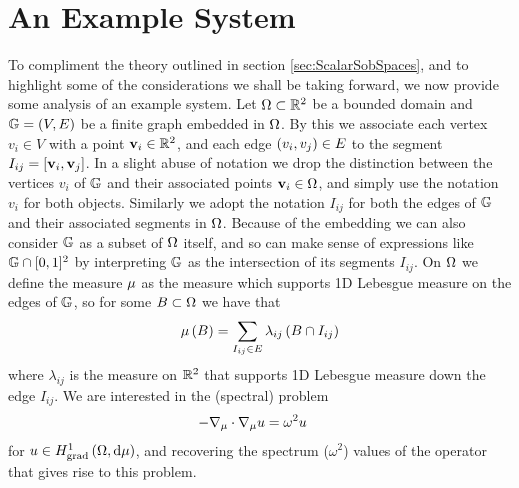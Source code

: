 \section{An Example System}
To compliment the theory outlined in section \ref{sec:ScalarSobSpaces}, and to highlight some of the considerations we shall be taking forward, we now provide some analysis of an example system.
Let $\Omega\subset\mathbb{R}^2$ be a bounded domain and $\mathbb{G} = \left( V,E \right)$ be a finite graph embedded in $\Omega$.
By this we associate each vertex $v_i\in V$ with a point $\mathbf{v}_i\in\mathbb{R}^2$, and each edge $\left( v_i,v_j \right)\in E$ to the segment $I_{ij}=\left[ \mathbf{v}_i,\mathbf{v}_j \right]$.
In a slight abuse of notation we drop the distinction between the vertices $v_i$ of $\mathbb{G}$ and their associated points $\mathbf{v}_i\in\Omega$, and simply use the notation $v_i$ for both objects.
Similarly we adopt the notation $I_{ij}$ for both the edges of $\mathbb{G}$ and their associated segments in $\Omega$.
Because of the embedding we can also consider $\mathbb{G}$ as a subset of $\Omega$ itself, and so can make sense of expressions like $\mathbb{G}\cap[0,1]^2$ by interpreting $\mathbb{G}$ as the intersection of its segments $I_{ij}$. 
On $\Omega$ we define the measure $\mu$ as the measure which supports 1D Lebesgue measure on the edges of $\mathbb{G}$, so for some $B\subset\Omega$ we have that 
\begin{align*}
	\mu\left( B \right) = \sum_{I_{ij}\in E}\lambda_{ij}\left( B \cap I_{ij} \right)
\end{align*}
where $\lambda_{ij}$ is the measure on $\mathbb{R}^2$ that supports 1D Lebesgue measure down the edge $I_{ij}$. 
We are interested in the (spectral) problem
\begin{align} \label{eq:ScalarExampleStrongForm}
	-\nabla_\mu \cdot \nabla_\mu u &= \omega^2 u
\end{align}
for $u\in H^1_\mathrm{grad}\left( \Omega, \mathrm{d}\mu \right)$, and recovering the spectrum ($\omega^2$) values of the operator that gives rise to this problem.

